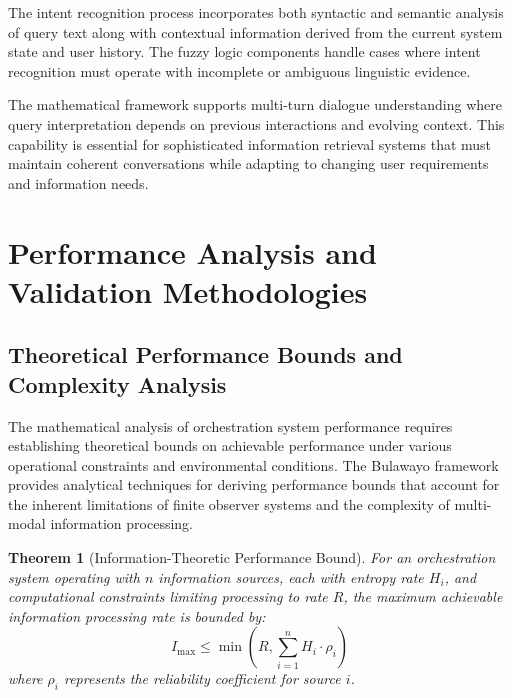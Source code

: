 \documentclass[12pt,a4paper]{article}
\newtheorem{theorem}{Theorem}[section]
\begin{document}
The intent recognition process incorporates both syntactic and semantic analysis of query text along with contextual information derived from the current system state and user history. The fuzzy logic components handle cases where intent recognition must operate with incomplete or ambiguous linguistic evidence.

The mathematical framework supports multi-turn dialogue understanding where query interpretation depends on previous interactions and evolving context. This capability is essential for sophisticated information retrieval systems that must maintain coherent conversations while adapting to changing user requirements and information needs.

\section{Performance Analysis and Validation Methodologies}

\subsection{Theoretical Performance Bounds and Complexity Analysis}

The mathematical analysis of orchestration system performance requires establishing theoretical bounds on achievable performance under various operational constraints and environmental conditions. The Bulawayo framework provides analytical techniques for deriving performance bounds that account for the inherent limitations of finite observer systems and the complexity of multi-modal information processing.

\begin{theorem}[Information-Theoretic Performance Bound]
For an orchestration system operating with $n$ information sources, each with entropy rate $H_i$, and computational constraints limiting processing to rate $R$, the maximum achievable information processing rate is bounded by:
\begin{equation}
I_{\text{max}} \leq \min\left(R, \sum_{i=1}^{n} H_i \cdot \rho_i\right)
\end{equation}
where $\rho_i$ represents the reliability coefficient for source $i$.
\end{theorem}
\end{document}
